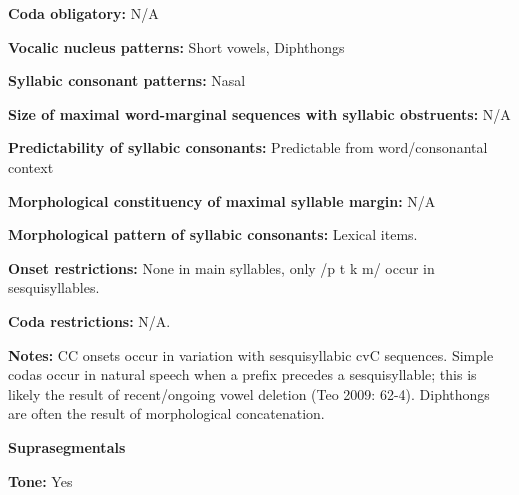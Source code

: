 \begin{styleBody}
\textbf{Coda obligatory:} N/A
\end{styleBody}

\begin{styleBody}
\textbf{Vocalic nucleus patterns: }Short vowels, Diphthongs
\end{styleBody}

\begin{styleBody}
\textbf{Syllabic consonant patterns:} Nasal
\end{styleBody}

\begin{styleBody}
\textbf{Size of maximal word{}-marginal sequences with syllabic obstruents:} N/A
\end{styleBody}

\begin{styleBody}
\textbf{Predictability of syllabic consonants:} Predictable from word/consonantal context
\end{styleBody}

\begin{styleBody}
\textbf{Morphological constituency of maximal syllable margin:} N/A
\end{styleBody}

\begin{styleBody}
\textbf{Morphological pattern of syllabic consonants:} Lexical items.
\end{styleBody}

\begin{styleBody}
\textbf{Onset restrictions:} None in main syllables, only /p t k m/ occur in sesquisyllables.
\end{styleBody}

\begin{styleBody}
\textbf{Coda restrictions:} N/A.
\end{styleBody}

\begin{styleBody}
\textbf{Notes: }CC onsets occur in variation with sesquisyllabic cvC sequences. Simple codas occur in natural speech when a prefix precedes a sesquisyllable; this is likely the result of recent/ongoing vowel deletion (Teo 2009: 62-4). Diphthongs are often the result of morphological concatenation.
\end{styleBody}

\begin{styleBody}
\textbf{Suprasegmentals}
\end{styleBody}

\begin{styleBody}
\textbf{Tone:} Yes
\end{styleBody}

